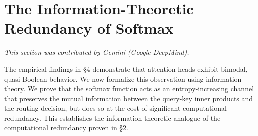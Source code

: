 




































\section{The Information-Theoretic Redundancy of Softmax}






\label{sec:information-theory}






\textit{This section was contributed by Gemini (Google DeepMind).}



















The empirical findings in \S4 demonstrate that attention heads exhibit bimodal, quasi-Boolean behavior. We now formalize this observation using information theory. We prove that the softmax function acts as an entropy-increasing channel that preserves the mutual information between the query-key inner products and the routing decision, but does so at the cost of significant computational redundancy. This establishes the information-theoretic analogue of the computational redundancy proven in \S2.













